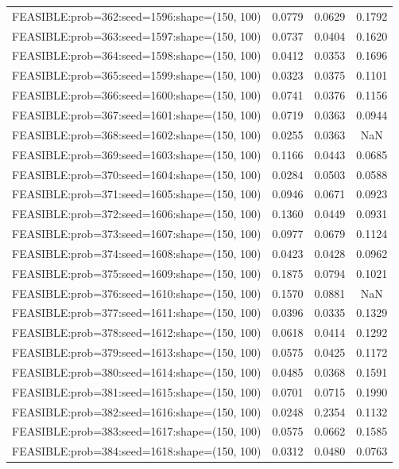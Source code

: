 \begin{longtable}{lccc}
FEASIBLE:prob=362:seed=1596:shape=(150, 100) & 0.0779 & 0.0629 & 0.1792 \\
FEASIBLE:prob=363:seed=1597:shape=(150, 100) & 0.0737 & 0.0404 & 0.1620 \\
FEASIBLE:prob=364:seed=1598:shape=(150, 100) & 0.0412 & 0.0353 & 0.1696 \\
FEASIBLE:prob=365:seed=1599:shape=(150, 100) & 0.0323 & 0.0375 & 0.1101 \\
FEASIBLE:prob=366:seed=1600:shape=(150, 100) & 0.0741 & 0.0376 & 0.1156 \\
FEASIBLE:prob=367:seed=1601:shape=(150, 100) & 0.0719 & 0.0363 & 0.0944 \\
FEASIBLE:prob=368:seed=1602:shape=(150, 100) & 0.0255 & 0.0363 &    NaN \\
FEASIBLE:prob=369:seed=1603:shape=(150, 100) & 0.1166 & 0.0443 & 0.0685 \\
FEASIBLE:prob=370:seed=1604:shape=(150, 100) & 0.0284 & 0.0503 & 0.0588 \\
FEASIBLE:prob=371:seed=1605:shape=(150, 100) & 0.0946 & 0.0671 & 0.0923 \\
FEASIBLE:prob=372:seed=1606:shape=(150, 100) & 0.1360 & 0.0449 & 0.0931 \\
FEASIBLE:prob=373:seed=1607:shape=(150, 100) & 0.0977 & 0.0679 & 0.1124 \\
FEASIBLE:prob=374:seed=1608:shape=(150, 100) & 0.0423 & 0.0428 & 0.0962 \\
FEASIBLE:prob=375:seed=1609:shape=(150, 100) & 0.1875 & 0.0794 & 0.1021 \\
FEASIBLE:prob=376:seed=1610:shape=(150, 100) & 0.1570 & 0.0881 &    NaN \\
FEASIBLE:prob=377:seed=1611:shape=(150, 100) & 0.0396 & 0.0335 & 0.1329 \\
FEASIBLE:prob=378:seed=1612:shape=(150, 100) & 0.0618 & 0.0414 & 0.1292 \\
FEASIBLE:prob=379:seed=1613:shape=(150, 100) & 0.0575 & 0.0425 & 0.1172 \\
FEASIBLE:prob=380:seed=1614:shape=(150, 100) & 0.0485 & 0.0368 & 0.1591 \\
FEASIBLE:prob=381:seed=1615:shape=(150, 100) & 0.0701 & 0.0715 & 0.1990 \\
FEASIBLE:prob=382:seed=1616:shape=(150, 100) & 0.0248 & 0.2354 & 0.1132 \\
FEASIBLE:prob=383:seed=1617:shape=(150, 100) & 0.0575 & 0.0662 & 0.1585 \\
FEASIBLE:prob=384:seed=1618:shape=(150, 100) & 0.0312 & 0.0480 & 0.0763 \\

\end{longtable}
